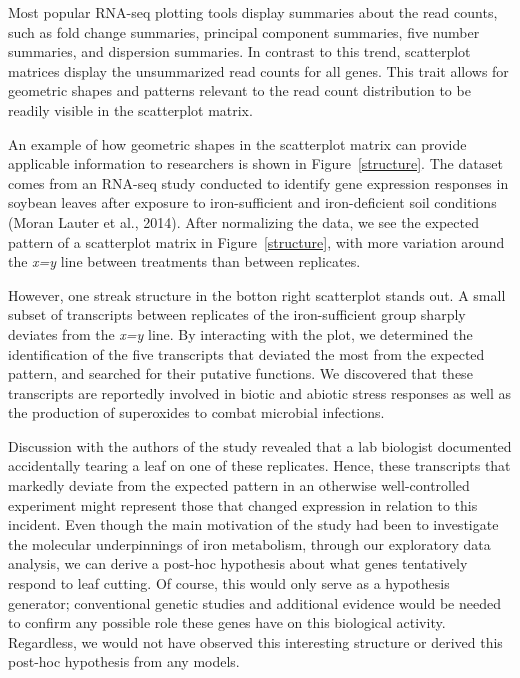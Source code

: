 \documentclass[useAMS,referee]{biom}
\begin{document}
Most popular RNA-seq plotting tools display summaries about the read counts, such as fold change summaries, principal component summaries, five number summaries, and dispersion summaries. In contrast to this trend, scatterplot matrices display the unsummarized read counts for all genes. This trait allows for geometric shapes and patterns relevant to the read count distribution to be readily visible in the scatterplot matrix.

An example of how geometric shapes in the scatterplot matrix can provide applicable information to researchers is shown in Figure~\ref{structure}. The dataset comes from an RNA-seq study conducted to identify gene expression responses in soybean leaves after exposure to iron-sufficient and iron-deficient soil conditions (Moran Lauter et al., 2014). After normalizing the data, we see the expected pattern of a scatterplot matrix in Figure~\ref{structure}, with more variation around the \textit{x=y} line between treatments than between replicates. 

However, one streak structure in the botton right scatterplot stands out. A small subset of transcripts between replicates of the iron-sufficient group sharply deviates from the \textit{x=y} line. By interacting with the plot, we determined the identification of the five transcripts that deviated the most from the expected pattern, and searched for their putative functions. We discovered that these transcripts are reportedly involved in biotic and abiotic stress responses as well as the production of superoxides to combat microbial infections.

Discussion with the authors of the study revealed that a lab biologist documented accidentally tearing a leaf on one of these replicates. Hence, these transcripts that markedly deviate from the expected pattern in an otherwise well-controlled experiment might represent those that changed expression in relation to this incident. Even though the main motivation of the study had been to investigate the molecular underpinnings of iron metabolism, through our exploratory data analysis, we can derive a post-hoc hypothesis about what genes tentatively respond to leaf cutting. Of course, this would only serve as a hypothesis generator; conventional genetic studies and additional evidence would be needed to confirm any possible role these genes have on this biological activity. Regardless, we would not have observed this interesting structure or derived this post-hoc hypothesis from any models.
\end{document}
